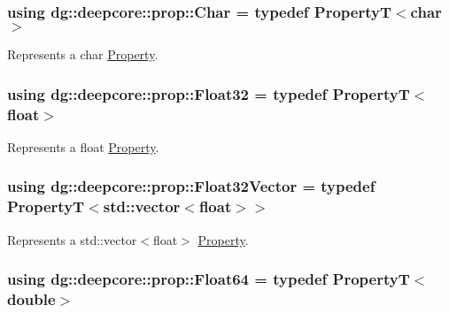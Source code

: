 \subsubsection[{\texorpdfstring{Char}{Char}}]{\setlength{\rightskip}{0pt plus 5cm}using {\bf dg\+::deepcore\+::prop\+::\+Char} = typedef PropertyT$<$char$>$}\hypertarget{group___process_properties_ga2ba635b306b0b9966b3b14da127b9fd4}{}\label{group___process_properties_ga2ba635b306b0b9966b3b14da127b9fd4}


Represents a {\ttfamily char} \hyperlink{classdg_1_1deepcore_1_1_property}{Property}. 

\subsubsection[{\texorpdfstring{Float32}{Float32}}]{\setlength{\rightskip}{0pt plus 5cm}using {\bf dg\+::deepcore\+::prop\+::\+Float32} = typedef PropertyT$<$float$>$}\hypertarget{group___process_properties_ga510dd39bb8449946d6317469973644c9}{}\label{group___process_properties_ga510dd39bb8449946d6317469973644c9}


Represents a {\ttfamily float} \hyperlink{classdg_1_1deepcore_1_1_property}{Property}. 

\subsubsection[{\texorpdfstring{Float32\+Vector}{Float32Vector}}]{\setlength{\rightskip}{0pt plus 5cm}using {\bf dg\+::deepcore\+::prop\+::\+Float32\+Vector} = typedef PropertyT$<$std\+::vector$<$float$>$$>$}\hypertarget{group___process_properties_gab55f125818d29c40da45bf6bb17c769e}{}\label{group___process_properties_gab55f125818d29c40da45bf6bb17c769e}


Represents a {\ttfamily std\+::vector$<$float$>$} \hyperlink{classdg_1_1deepcore_1_1_property}{Property}. 

\subsubsection[{\texorpdfstring{Float64}{Float64}}]{\setlength{\rightskip}{0pt plus 5cm}using {\bf dg\+::deepcore\+::prop\+::\+Float64} = typedef PropertyT$<$double$>$}\hypertarget{group___process_properties_ga9c03a5a68945303265f5ab945f2bfa2a}{}\label{group___process_properties_ga9c03a5a68945303265f5ab945f2bfa2a}


